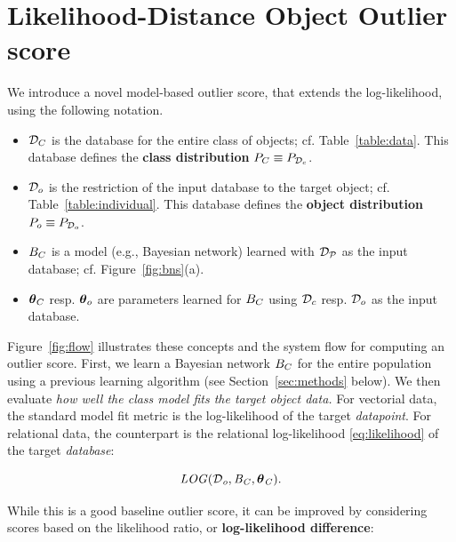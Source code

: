 \documentclass[conference]{IEEEtran}
\begin{document}
\section{Likelihood-Distance Object Outlier score} \label{sec:metrics}

We introduce a novel model-based outlier score, that extends the log-likelihood, using the following notation.
\begin{itemize}
\item $\mathcal{D}_{C}$ is the database for the entire class of objects; cf. Table~\ref{table:data}. This database defines the \textbf{class distribution} $P_{C} \equiv P_{\mathcal{D}_{c}}$.
\item $\mathcal{D}_{o}$ is the restriction of the input database to the target object; cf. Table~\ref{table:individual}. This database defines the \textbf{object distribution} $P_{o} \equiv P_{\mathcal{D}_{o}}$.
\item $B_{C}$ is a model (e.g., Bayesian network) learned with $\mathcal{D}_{\mathcal{P}}$ as the input database; cf. Figure~\ref{fig:bns}(a).
\item $\boldsymbol{\theta}_{C}$ resp. $\boldsymbol{\theta}_{o}$ are parameters learned for $B_{C}$ using $\mathcal{D}_{c}$ resp. $\mathcal{D}_{o}$ as the input database.
\end{itemize}

Figure~\ref{fig:flow} illustrates these concepts and the system flow for computing an outlier score. First, we learn a Bayesian network $B_{C}$ for the entire population using a previous learning algorithm (see Section~\ref{sec:methods} below). We then evaluate {\em how well the class model fits the target object data.} For vectorial data, the  standard model fit metric %
is the log-likelihood of the target {\em datapoint}. For relational data, the counterpart is the relational log-likelihood \eqref{eq:likelihood} of the target {\em database}:

\begin{equation} \label{eq:loglikelihood-score}
\loglikelihood(\D_{\object},\model_{\Class},\parameters_{\Class}).
\end{equation}



While this
is a good baseline outlier score, it can be improved by considering scores based on the likelihood ratio, or {\bf log-likelihood difference}:
\end{document}
